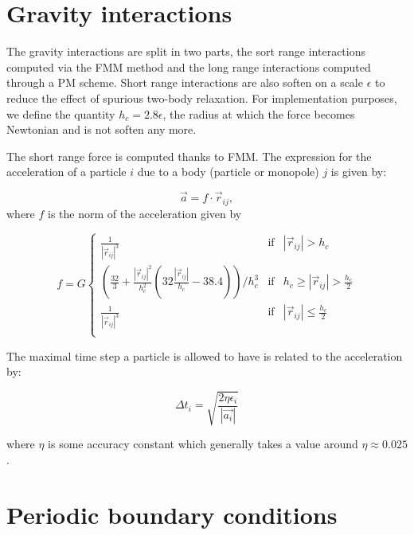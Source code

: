 \documentclass[a4paper,10pt]{report}
\begin{document}
\section{Gravity interactions}

The gravity interactions are split in two parts, the sort range interactions computed via the FMM method and the long 
range interactions computed through a PM scheme. Short range interactions are also soften on a scale $\epsilon$ to 
reduce the effect of spurious two-body relaxation. For implementation purposes, we define the quantity $h_c = 
2.8\epsilon$, the radius at which the force becomes Newtonian and is not soften any more.

The short range force is computed thanks to FMM. The expression for the acceleration of a particle $i$ due to a body 
(particle or monopole) $j$ is given by:

\begin{equation}
 \vec{a} = f \cdot \vec{r}_{ij},
\end{equation}
 where $f$ is the norm of the acceleration given by

\begin{equation}
 f = G\left\lbrace \begin{array}{rcl}
                    \frac{1}{|\vec{r}_{ij}|^3}  & \mbox{if} & |\vec{r}_{ij}| > h_c \\
                    (\frac{32}{3} + \frac{|\vec{r}_{ij}|^2}{h_c^2} (32 \frac{|\vec{r}_{ij}|}{h_c} - 38.4)) / h_c^3  & 
\mbox{if} & h_c \geq |\vec{r}_{ij}| > \frac{h_c}{2} \\	
                    \frac{1}{|\vec{r}_{ij}|^3}  & \mbox{if} & |\vec{r}_{ij}| \leq \frac{h_c}{2} \\		
		    \end{array}\right.
\end{equation}

 
The maximal time step a particle is allowed to have is related to the acceleration by:

\begin{equation}
 \Delta t_i = \sqrt{\frac{2\eta \epsilon_i}{|\vec{a_i}|}}
\end{equation}

where $\eta$ is some accuracy constant which generally takes a value around $\eta \approx 0.025$.

\section{Periodic boundary conditions}
\end{document}
